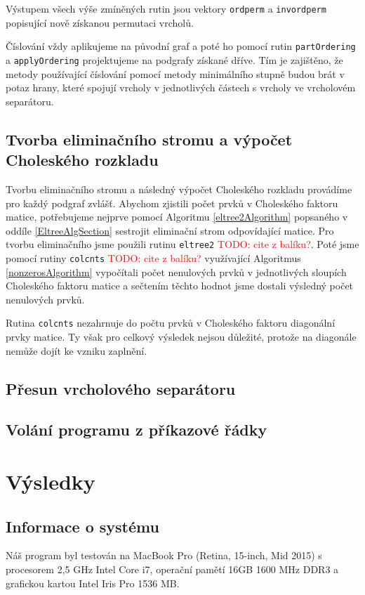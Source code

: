 \documentclass[11pt,american,czech,oneside]{book}
\theoremstyle{plain}
\theoremstyle{definition}
\newcommand{\TODO}[1]{\textcolor{red}{TODO: #1}}
\begin{document}
Výstupem všech výše zmíněných rutin jsou vektory \texttt{ordperm} a \texttt{invordperm} popisující nově získanou permutaci vrcholů.

Číslování vždy aplikujeme na původní graf a poté ho pomocí rutin \texttt{partOrdering} a \texttt{applyOrdering} projektujeme na podgrafy získané dříve. Tím je zajištěno, že metody používající číslování pomocí metody minimálního stupně budou brát v potaz hrany, které spojují vrcholy v jednotlivých částech s vrcholy ve vrcholovém separátoru.

\section{Tvorba eliminačního stromu a výpočet Choleského rozkladu}
Tvorbu eliminačního stromu a následný výpočet Choleského rozkladu provádíme pro každý podgraf zvlášť. Abychom zjistili počet prvků v Choleského faktoru matice, potřebujeme nejprve pomocí Algoritmu \ref{eltree2Algorithm} popsaného v oddíle \ref{EltreeAlgSection} sestrojit eliminační strom odpovídající matice. Pro tvorbu eliminačního jsme použili rutinu \texttt{eltree2} \TODO{cite z balíku?}. Poté jsme pomocí rutiny \texttt{colcnts} \TODO{cite z balíku?} využívající Algoritmus \ref{nonzerosAlgorithm} vypočítali počet nenulových prvků v jednotlivých sloupích Choleského faktoru matice a sečtením těchto hodnot jsme dostali výsledný počet nenulových prvků. 

Rutina \texttt{colcnts} nezahrnuje do počtu prvků v Choleského faktoru diagonální prvky matice. Ty však pro celkový výsledek nejsou důležité, protože na diagonále nemůže dojít ke vzniku zaplnění.

\section{Přesun vrcholového separátoru}


\section{Volání programu z příkazové řádky}

\chapter{Výsledky}

\section{Informace o systému}
Náš program byl testován na MacBook Pro (Retina, 15-inch, Mid 2015) s procesorem 2,5 GHz Intel Core i7, operační pamětí 16GB 1600 MHz DDR3 a grafickou kartou Intel Iris Pro 1536 MB.
\end{document}
